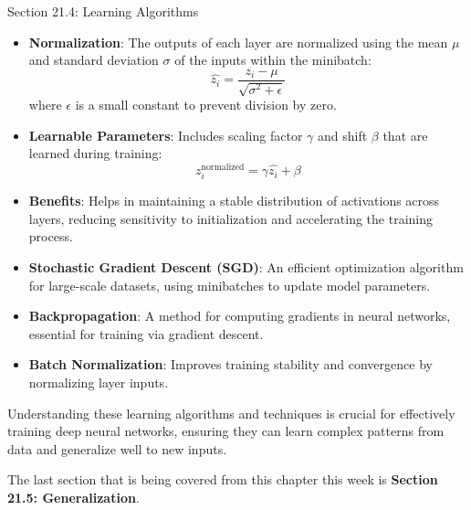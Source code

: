 \begin{notes}{Section 21.4: Learning Algorithms}
\begin{highlight}
        \begin{itemize}
            \item \textbf{Normalization}: The outputs of each layer are normalized using the mean $\mu$ and standard deviation $\sigma$ of the inputs within the minibatch:
            \[
            \hat{z_i} = \frac{z_i - \mu}{\sqrt{\sigma^2 + \epsilon}}
            \]
            where $\epsilon$ is a small constant to prevent division by zero.
            \item \textbf{Learnable Parameters}: Includes scaling factor $\gamma$ and shift $\beta$ that are learned during training:
            \[
            z_i^{\text{normalized}} = \gamma \hat{z_i} + \beta
            \]
            \item \textbf{Benefits}: Helps in maintaining a stable distribution of activations across layers, reducing sensitivity to initialization and accelerating the training process.
        \end{itemize}
    
    \end{highlight}
    
    \begin{highlight}
    
        \begin{itemize}
            \item \textbf{Stochastic Gradient Descent (SGD)}: An efficient optimization algorithm for large-scale datasets, using minibatches to update model parameters.
            \item \textbf{Backpropagation}: A method for computing gradients in neural networks, essential for training via gradient descent.
            \item \textbf{Batch Normalization}: Improves training stability and convergence by normalizing layer inputs.
        \end{itemize}
    
        Understanding these learning algorithms and techniques is crucial for effectively training deep neural networks, ensuring they can learn complex patterns from data and generalize well to new inputs.
    
    \end{highlight}
\end{notes}

The last section that is being covered from this chapter this week is \textbf{Section 21.5: Generalization}.

